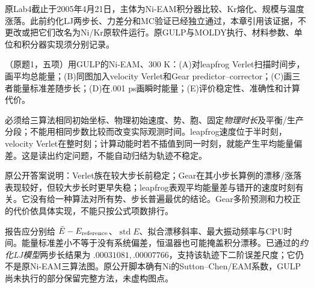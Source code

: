 原Lab4截止于2005年4月21日，主体为Ni-EAM积分器比较、Kr熔化、规模与温度涨落。此前约化LJ两步长、力差分和MC验证已经独立通过，本章引用该证据，不更改或把它们改名为Ni/Kr原软件运行。原GULP与MOLDY执行、材料参数、单位和积分器实现须分别记录。

\begin{exercise}\label{task:lab4-1}
（原题1，五项）用GULP的Ni-EAM、300 K：(A)对leapfrog Verlet扫描时间步，画平均总能量；(B)同图加入velocity Verlet和Gear predictor--corrector；(C)画三者能量标准差随步长；(D)在.001 ps画瞬时能量；(E)评价稳定性、准确性和计算代价。
\end{exercise}
\begin{solution}
必须给三算法相同初始坐标、物理初始速度、势、胞、固定\emph{物理时长}及平衡/生产分段；不能用相同步数比较而改变实际观测时间。leapfrog速度位于半时刻，velocity Verlet在整时刻；计算动能时若不插值到同一时刻，就能产生平均能量偏差。这是读出约定问题，不能自动归结为轨迹不稳定。

原公开答案说明：Verlet族在较大步长前稳定；Gear在其小步长算例的漂移/涨落表现较好，但较大步长时更早失稳；leapfrog表观平均能量差与错开的速度时刻有关。它没有给一种算法对所有势、步长普遍最优的结论。Gear多阶预测和力校正的代价依具体实现，不能只按公式项数排行。

报告应分别给 $\bar E-E_{\rm reference}$、$\operatorname{std}E$、拟合漂移斜率、最大振动频率与CPU时间。能量标准差小不等于没有系统偏差，恒温器也可能掩盖积分漂移。已通过的\emph{约化LJ模型}两步长结果为 $.00031081,.00007766$，支持该轨迹下二阶误差尺度；它仍不是原Ni-EAM三算法图。原公开脚本确有Ni的Sutton--Chen/EAM系数，GULP尚未执行的部分保留完整方法，未虚构图点。
\end{solution}

